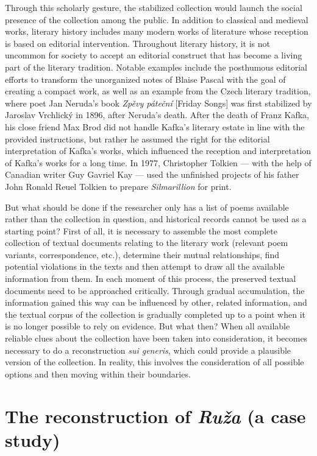 \documentclass{article}
\begin{document}
Through this scholarly gesture, the stabilized collection would launch
the social presence of the collection among the public. In addition to
classical and medieval works, literary history includes many modern
works of literature whose reception is based on editorial intervention.
Throughout literary history, it is not uncommon for society to accept an
editorial construct that has become a living part of the literary
tradition. Notable examples include the posthumous editorial efforts to
transform the unorganized notes of Blaise Pascal with the goal of
creating a compact work, as well as an example from the Czech literary
tradition, where poet Jan Neruda's book \emph{Zpěvy páteční} [Friday
Songs] was first stabilized by Jaroslav Vrchlický in 1896, after
Neruda's death. After the death of Franz Kafka, his close friend Max
Brod did not handle Kafka's literary estate in line with the provided
instructions, but rather he assumed the right for the editorial
interpretation of Kafka's works, which influenced the reception and
interpretation of Kafka's works for a long time. In 1977, Christopher
Tolkien –– with the help of Canadian writer Guy Gavriel Kay –– used the
unfinished projects of his father John Ronald Reuel Tolkien to prepare
\emph{Silmarillion} for print.

But what should be done if the researcher only has a list of poems
available rather than the collection in question, and historical records
cannot be used as a starting point? First of all, it is necessary to
assemble the most complete collection of textual documents relating to
the literary work (relevant poem variants, correspondence, etc.),
determine their mutual relationships, find potential violations in the
texts and then attempt to draw all the available information from them.
In each moment of this process, the preserved textual documents need to
be approached critically. Through gradual accumulation, the information
gained this way can be influenced by other, related information, and the
textual corpus of the collection is gradually completed up to a point
when it is no longer possible to rely on evidence. But what then? When
all available reliable clues about the collection have been taken into
consideration, it becomes necessary to do a reconstruction \emph{sui
generis}, which could provide a plausible version of the collection. In
reality, this involves the consideration of all possible options and
then moving within their boundaries.

\section{The reconstruction of \emph{Ruža} (a case
study)}
\end{document}
